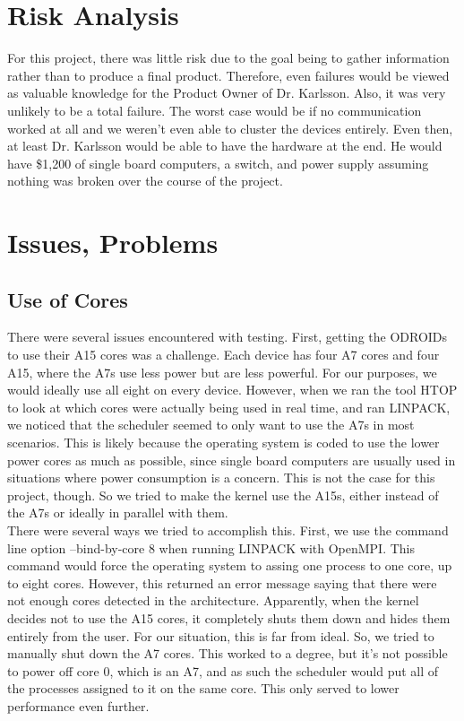 
\section{Risk Analysis}

For this project, there was little risk due to the goal being to gather information rather than to produce a final product. Therefore, even failures would be viewed as valuable knowledge for the Product Owner of Dr. Karlsson. Also, it was very unlikely to be a total failure. The worst case would be if no communication worked at all and we weren't even able to cluster the devices entirely. Even then, at least Dr. Karlsson would be able to have the hardware at the end. He would have \$1,200 of single board computers, a switch, and power supply assuming nothing was broken over the course of the project.

\section{Issues, Problems}

\subsection{Use of Cores}

There were several issues encountered with testing. First, getting the ODROIDs to use their A15 cores was a challenge. Each device has four A7 cores and four A15, where the A7s use less power but are less powerful. For our purposes, we would ideally use all eight on every device. However, when we ran the tool HTOP to look at which cores were actually being used in real time, and ran LINPACK, we noticed that the scheduler seemed to only want to use the A7s in most scenarios. This is likely because the operating system is coded to use the lower power cores as much as possible, since single board computers are usually used in situations where power consumption is a concern. This is not the case for this project, though. So we tried to make the kernel use the A15s, either instead of the A7s or ideally in parallel with them. \\

There were several ways we tried to accomplish this. First, we use the command line option --bind-by-core 8 when running LINPACK with OpenMPI. This command would force the operating system to assing one process to one core, up to eight cores. However, this returned an error message saying that there were not enough cores detected in the architecture. Apparently, when the kernel decides not to use the A15 cores, it completely shuts them down and hides them entirely from the user. For our situation, this is far from ideal. So, we tried to manually shut down the A7 cores. This worked to a degree, but it's not possible to power off core 0, which is an A7, and as such the scheduler would put all of the processes assigned to it on the same core. This only served to lower performance even further. \\


